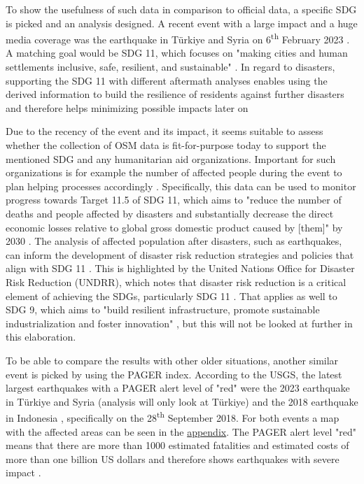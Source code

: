 \documentclass[oneside,twocolumn,10pt,cleanfoot,cleanhead]{asme2ej}
\begin{document}
To show the usefulness of such data in comparison to official data, a specific SDG is picked and an analysis designed.
A recent event with a large impact and a huge media coverage was the earthquake in Türkiye and Syria on 6\textsuperscript{th} February 2023 \cite{USGS2023a}.
A matching goal would be SDG 11, which focuses on "making cities and human settlements inclusive, safe, resilient, and sustainable" \cite{SDG11}.
In regard to disasters, supporting the SDG 11 with different aftermath analyses enables using the derived information to build the resilience of residents against further disasters and therefore helps minimizing possible impacts later on \cite{YouthMappers2023, ScholzEA2018, Tan2022}

Due to the recency of the event and its impact, it seems suitable to assess whether the collection of OSM data is fit-for-purpose today to support the mentioned SDG and any humanitarian aid organizations.
Important for such organizations is for example the number of affected people during the event to plan helping processes accordingly \cite{ScholzEA2018, GreenoughNelson2019, OpenMapping}.
Specifically, this data can be used to monitor progress towards Target 11.5 of SDG 11, which aims to "reduce the number of deaths and people affected by disasters and substantially decrease the direct economic losses relative to global gross domestic product caused by [them]" by 2030 \cite{SDG11}.
The analysis of affected population after disasters, such as earthquakes, can inform the development of disaster risk reduction strategies and policies that align with SDG 11 \cite{GreenoughNelson2019, OpenMapping}.
This is highlighted by the United Nations Office for Disaster Risk Reduction (UNDRR), which notes that disaster risk reduction is a critical element of achieving the SDGs, particularly SDG 11 \cite{UNDRR2015}.
That applies as well to SDG 9, which aims to "build resilient infrastructure, promote sustainable industrialization and foster innovation" \cite{SDG9}, but this will not be looked at further in this elaboration.

To be able to compare the results with other older situations, another similar event is picked by using the PAGER index.
According to the USGS, the latest largest earthquakes with a PAGER alert level of "red" were the 2023 earthquake in Türkiye and Syria (analysis will only look at Türkiye) and the 2018 earthquake in Indonesia \cite{USGS2023a}, specifically on the 28\textsuperscript{th} September 2018.
For both events a map with the affected areas can be seen in the \hyperref[appendix]{appendix}.
The PAGER alert level "red" means that there are more than 1000 estimated fatalities and estimated costs of more than one billion US dollars and therefore shows earthquakes with severe impact \cite{USGS2023b}.
\end{document}
